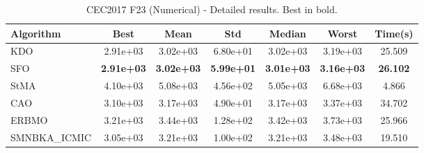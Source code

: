 \begin{table}[H]
\centering\small
\caption{CEC2017 F23 (Numerical) - Detailed results. Best in bold.}
\label{tab:cec2017_F23}
\begin{tabular}{lcccccc}
\toprule
\textbf{Algorithm} & \textbf{Best} & \textbf{Mean} & \textbf{Std} & \textbf{Median} & \textbf{Worst} & \textbf{Time(s)} \\
\midrule
KDO & 2.91e+03 & 3.02e+03 & 6.80e+01 & 3.02e+03 & 3.19e+03 & 25.509 \\
SFO & \textbf{2.91e+03} & \textbf{3.02e+03} & \textbf{5.99e+01} & \textbf{3.01e+03} & \textbf{3.16e+03} & \textbf{26.102} \\
StMA & 4.10e+03 & 5.08e+03 & 4.56e+02 & 5.05e+03 & 6.68e+03 & 4.866 \\
CAO & 3.10e+03 & 3.17e+03 & 4.90e+01 & 3.17e+03 & 3.37e+03 & 34.702 \\
ERBMO & 3.21e+03 & 3.44e+03 & 1.28e+02 & 3.42e+03 & 3.73e+03 & 25.966 \\
SMNBKA_ICMIC & 3.05e+03 & 3.21e+03 & 1.00e+02 & 3.21e+03 & 3.48e+03 & 19.510 \\
\bottomrule
\end{tabular}
\end{table}
